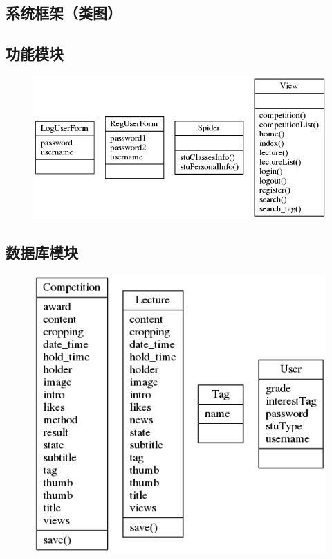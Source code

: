 \documentclass[UTF8]{ctexart}
\begin{document}
\begin{spacing}{1.3}
\section{系统框架（类图）}

\subsection{功能模块}
		\begin{figure}[H]
				\centering
				\includegraphics[width=\textwidth]{classes_view.png}
		\end{figure}

\subsection{数据库模块}
		\begin{figure}[H]
				\centering
				\includegraphics[width=\textwidth]{classes_model.png}
		\end{figure}
		

\end{spacing}
\end{document}
